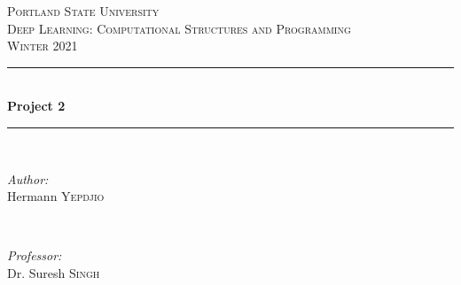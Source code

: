 \documentclass[12pt]{article}
\begin{document}
	
	\begin{titlepage}
		
		\newcommand{\HRule}{\rule{\linewidth}{0.5mm}} %
		
		\center %
		
		
		\textsc{\LARGE Portland State University}\\[1.5cm] %
		\textsc{\Large Deep Learning: Computational Structures and Programming}\\[0.5cm] %
		\textsc{\large Winter 2021}\\[0.5cm] %
		
		
		\HRule \\[0.4cm]
		{ \huge \bfseries Project 2}\\[0.4cm] %
		\HRule \\[1.5cm]
		
		
		\begin{minipage}{0.4\textwidth}
			\begin{flushleft} \large
				\emph{Author:}\\
				Hermann \textsc{Yepdjio} %
			\end{flushleft}
		\end{minipage}
		~
		\begin{minipage}{0.4\textwidth}
			\begin{flushright} \large
				\emph{Professor:} \\
				Dr. Suresh \textsc{Singh} %
			\end{flushright}
		\end{minipage}\\[1cm]
		

\end{titlepage}
\end{document}
